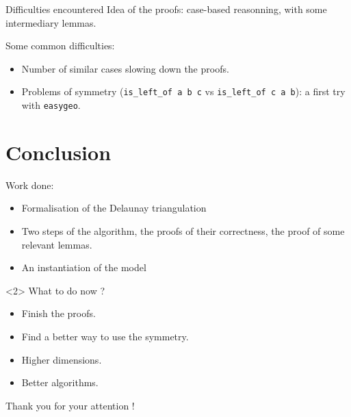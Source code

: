 \documentclass[18pt]{beamer}
\begin{document}
\begin{frame}{Difficulties encountered}
Idea of the proofs: case-based reasonning, with some intermediary lemmas.

Some common difficulties:
\begin{itemize}
 \item<2-> Number of similar cases slowing down the proofs.
 \item<3-> Problems of symmetry ({\tt is\_left\_of a b c} vs {\tt is\_left\_of c a b}): a first try with {\tt easygeo}.
\end{itemize}

\end{frame}


\section{Conclusion}
\begin{frame}
Work done:
\begin{itemize}
 \item Formalisation of the Delaunay triangulation
 \item Two steps of the algorithm, the proofs of their correctness, the proof of some relevant lemmas.
 \item An instantiation of the model
\end{itemize}

\begin{uncoverenv}<2>
What to do now ?
\begin{itemize}
 \item Finish the proofs.
 \item Find a better way to use the symmetry.
 \item Higher dimensions.
 \item Better algorithms.
\end{itemize}
\end{uncoverenv}
\end{frame}


\begin{frame}
\begin{centering}
 Thank you for your attention !
\end{centering}

\end{frame}
\end{document}

